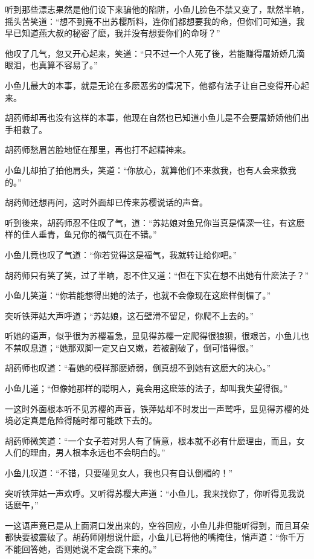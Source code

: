 \documentclass[12pt,oneside]{book}
\begin{document}
听到那些漂志果然是他们设下来骗他的陷阱，小鱼儿脸色不禁又变了，默然半晌，摇头苦笑道：``想不到竟不出苏樱所料，连你们都想要我的命，但你们可知道，我早已知道燕大叔的秘密了麽，我并没有想要你们的命呀？''

他叹了几气，忽又开心起来，笑道：``只不过一个人死了後，若能赚得屠娇娇几滴眼泪，也真算不容易了。''

小鱼儿最大的本事，就是无论在多麽恶劣的情况下，他都有法子让自己变得开心起来。

胡药师却再也没有这样的本事，他现在自然也已知道小鱼儿是不会要屠娇娇他们出手相救了。

胡药师愁眉苦脸地怔在那里，再也打不起精神来。

小鱼儿却拍了拍他肩头，笑道：``你放心，就算他们不来救我，也有人会来救我的。''

胡药师还想再问，这时外面却已传来苏樱说话的声音。

听到後来，胡药师忍不住叹了气，道：``苏姑娘对鱼兄你当真是情深一往，有这麽样的佳人垂青，鱼兄你的福气页在不错。''

小鱼儿竟也叹了气道：``你若觉得这是福气，我就转让给你吧。''

胡药师只有笑了笑，过了半晌，忍不住又道：``但在下实在想不出她有什麽法子？''

小鱼儿笑道：``你若能想得出她的法子，也就不会像现在这麽样倒楣了。''

突听铁萍姑大声呼道；``苏姑娘，这石壁滑不留足，你爬不上去的。''

听她的语声，似乎很为苏樱着急，显见得苏樱一定爬得很狼狈，很艰苦，小鱼儿也不禁叹息道；``她那双脚一定又白又嫩，若被割破了，倒可惜得很。''

胡药师也叹道：``看她的模样那麽娇弱，倒真想不到她有这麽大的决心。''

小鱼儿道；``但像她那样的聪明人，竟会用这麽笨的法子，却叫我失望得很。''

一这时外面根本听不见苏樱的声音，铁萍姑却不时发出一声鹫呼，显见得苏樱的处境必定真是危险得随时都可能跌下去的。

胡药师微笑道：``一个女子若对男人有了情意，根本就不必有什麽理由，而且，女人们的理由，男人根本永远也不会明白的。''

小鱼儿叹道：``不错，只要碰见女人，我也只有自认倒楣的！''

突听铁萍姑一声欢呼。又听得苏樱大声道：``小鱼儿，我来找你了，你听得见我说话麽午，''

一这语声竟已是从上面洞口发出来的，空谷回应，小鱼儿非但能听得到，而且耳朵都快要被震破了。胡药师刚想说什麽，小鱼儿已将他的嘴掩住，悄声道：``你千万不能回答她，否则她说不定会跳下来的。''
\end{document}
